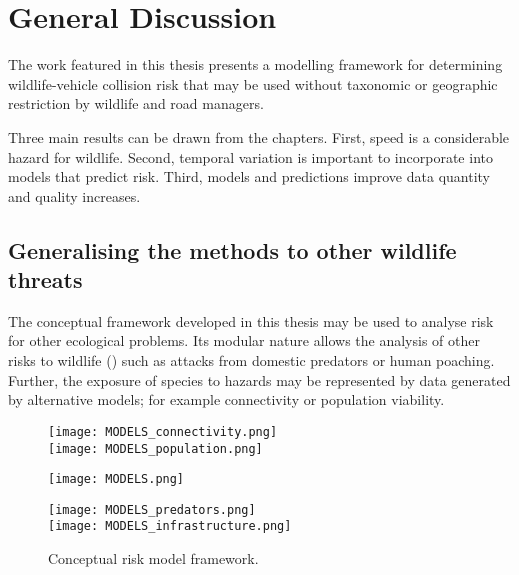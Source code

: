 \chapter{General Discussion}\label{sec:conc}
\newpage

The work featured in this thesis presents a modelling framework for determining wildlife-vehicle collision risk that may be used without taxonomic or geographic restriction by wildlife and road managers.

Three main results can be drawn from the chapters.
First, speed is a considerable hazard for wildlife.
Second, temporal variation is important to incorporate into models that predict risk.
Third, models and predictions improve data quantity and quality increases. 

\section{Generalising the methods to other wildlife threats}

The conceptual framework developed in this thesis may be used to analyse risk for other ecological problems. Its modular nature allows the analysis of other risks to wildlife () such as attacks from domestic predators or human poaching. Further, the exposure of species to hazards may be represented by data generated by alternative models; for example connectivity or population viability.

\begin{figure*}[htp]
  \centering
  	\begin{minipage}[t][][b]{.13\textwidth}
    	\centering
    	\texttt{[image: MODELS\_connectivity.png]}\\
    	\texttt{[image: MODELS\_population.png]}   	
    \end{minipage}
    \hspace{.05\textwidth}
  	\begin{minipage}{.38\textwidth}
    	\centering
    	\texttt{[image: MODELS.png]}
    \end{minipage}
    \hspace{.05\textwidth}
  	\begin{minipage}[t][][b]{.13\textwidth}
    	\centering
    	\texttt{[image: MODELS\_predators.png]}\\
    	\texttt{[image: MODELS\_infrastructure.png]}
    \end{minipage}    	   	   
  \caption[Conceptual risk model framework]{Conceptual risk model framework.}
  \label{gen_framework}
\end{figure*}


